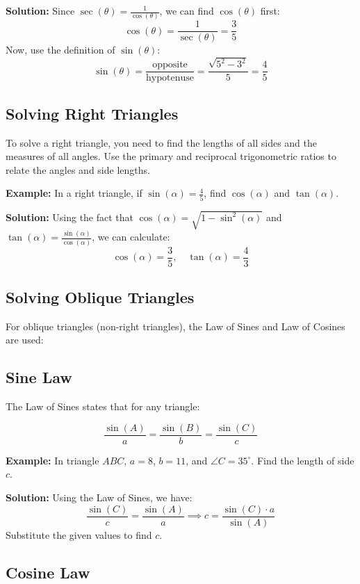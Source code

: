 \documentclass[12pt,a4paper]{article}
\begin{document}
\textbf{Solution:}
Since $\sec(\theta) = \frac{1}{\cos(\theta)}$, we can find $\cos(\theta)$ first:
\[\cos(\theta) = \frac{1}{\sec(\theta)} = \frac{3}{5}\]
Now, use the definition of $\sin(\theta)$:
\[\sin(\theta) = \frac{\text{opposite}}{\text{hypotenuse}} = \frac{\sqrt{5^2 - 3^2}}{5} = \frac{4}{5}\]

\subsection{Solving Right Triangles}

To solve a right triangle, you need to find the lengths of all sides and the measures of all angles. Use the primary and reciprocal trigonometric ratios to relate the angles and side lengths.

\textbf{Example:} In a right triangle, if $\sin(\alpha) = \frac{4}{5}$, find $\cos(\alpha)$ and $\tan(\alpha)$.

\textbf{Solution:}
Using the fact that $\cos(\alpha) = \sqrt{1 - \sin^2(\alpha)}$ and $\tan(\alpha) = \frac{\sin(\alpha)}{\cos(\alpha)}$, we can calculate:
\[\cos(\alpha) = \frac{3}{5}, \quad \tan(\alpha) = \frac{4}{3}\]

\subsection{Solving Oblique Triangles}

For oblique triangles (non-right triangles), the Law of Sines and Law of Cosines are used:

\subsection{Sine Law}

The Law of Sines states that for any triangle:

\[\frac{\sin(A)}{a} = \frac{\sin(B)}{b} = \frac{\sin(C)}{c}\]

\textbf{Example:} In triangle $ABC$, $a = 8$, $b = 11$, and $\angle C = 35^\circ$. Find the length of side $c$.

\textbf{Solution:}
Using the Law of Sines, we have:
\[\frac{\sin(C)}{c} = \frac{\sin(A)}{a} \implies c = \frac{\sin(C) \cdot a}{\sin(A)}\]
Substitute the given values to find $c$.

\subsection{Cosine Law}
\end{document}
